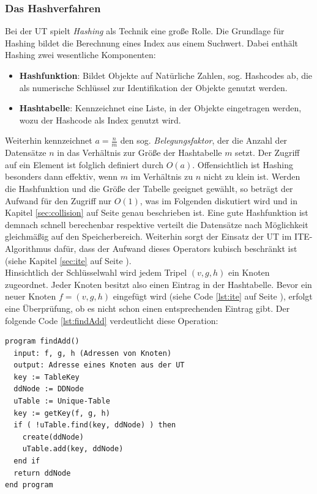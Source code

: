 \subsubsection{Das Hashverfahren}
\label{sec:hashing}
Bei der UT spielt \emph{Hashing} als Technik eine große Rolle. Die Grundlage für Hashing bildet die Berechnung eines Index aus einem Suchwert. Dabei enthält Hashing zwei wesentliche Komponenten:
\begin{itemize}
	\item \textbf{Hashfunktion}: Bildet Objekte auf Natürliche Zahlen, sog. Hashcodes ab, die als numerische Schlüssel zur Identifikation der Objekte genutzt werden.
	\item \textbf{Hashtabelle}: Kennzeichnet eine Liste, in der Objekte eingetragen werden, wozu der Hashcode als Index genutzt wird.
\end{itemize}
Weiterhin kennzeichnet $a = \frac{n}{m}$ den sog. \emph{Belegungsfaktor}, der die Anzahl der Datensätze $n$ in das Verhältnis zur Größe der Hashtabelle $m$ setzt. Der Zugriff auf ein Element ist folglich definiert durch $O(a)$. Offensichtlich ist Hashing besonders dann effektiv, wenn $m$ im Verhältnis zu $n$ nicht zu klein ist. Werden die Hashfunktion und die Größe der Tabelle geeignet gewählt, so beträgt der Aufwand für den Zugriff nur $O(1)$, was im Folgenden diskutiert wird und in Kapitel \ref{sec:collision} auf Seite \pageref{sec:collision} genau beschrieben ist. Eine gute Hashfunktion ist demnach schnell berechenbar respektive verteilt die Datensätze nach Möglichkeit gleichmäßig auf den Speicherbereich. Weiterhin sorgt der Einsatz der UT im ITE-Algorithmus dafür, dass der Aufwand dieses Operators kubisch beschränkt ist (siehe Kapitel \ref{sec:ite} auf Seite \pageref{sec:ite}).\\
Hinsichtlich der Schlüsselwahl wird jedem Tripel $(v, g, h)$ ein Knoten zugeordnet. Jeder Knoten besitzt also einen Eintrag in der Hashtabelle. Bevor ein neuer Knoten $f = (v, g, h)$ eingefügt wird (siehe Code \ref{lst:ite} auf Seite \pageref{lst:ite}), erfolgt eine Überprüfung, ob es nicht schon einen entsprechenden Eintrag gibt. Der folgende Code \ref{lst:findAdd} verdeutlicht diese Operation:
\lstset{language=xml}
\begin{lstlisting}[frame=htrbl, caption={Implementierung von {\ttfamily findAdd}}, label={lst:findAdd}]
program findAdd()
  input: f, g, h (Adressen von Knoten)
  output: Adresse eines Knoten aus der UT
  key := TableKey
  ddNode := DDNode
  uTable := Unique-Table
  key := getKey(f, g, h)
  if ( !uTable.find(key, ddNode) ) then
    create(ddNode)
    uTable.add(key, ddNode)
  end if
  return ddNode
end program
\end{lstlisting}

